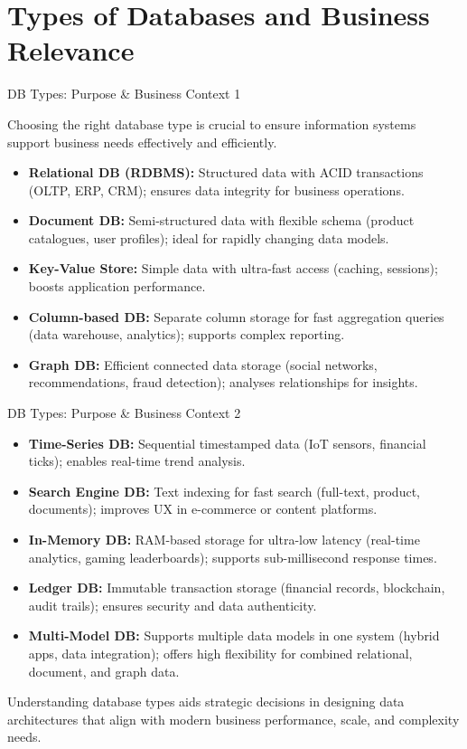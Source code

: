 \documentclass[aspectratio=169, table]{beamer}
\begin{document}
\section{Types of Databases and Business Relevance}

\begin{frame}{DB Types: Purpose \& Business Context 1}
	\vspace{20pt}
	
	Choosing the right database type is crucial to ensure information systems support business needs effectively and efficiently.
		
	\begin{itemize}
		\item \textbf{Relational DB (RDBMS):} Structured data with ACID transactions (OLTP, ERP, CRM); ensures data integrity for business operations.
		\item \textbf{Document DB:} Semi-structured data with flexible schema (product catalogues, user profiles); ideal for rapidly changing data models.
		\item \textbf{Key-Value Store:} Simple data with ultra-fast access (caching, sessions); boosts application performance.
		\item \textbf{Column-based DB:} Separate column storage for fast aggregation queries (data warehouse, analytics); supports complex reporting.
		\item \textbf{Graph DB:} Efficient connected data storage (social networks, recommendations, fraud detection); analyses relationships for insights.
	\end{itemize}
	
\end{frame}

\begin{frame}{DB Types: Purpose \& Business Context 2}
	\vspace{15pt}
	
	\begin{itemize}
		\item \textbf{Time-Series DB:} Sequential timestamped data (IoT sensors, financial ticks); enables real-time trend analysis.
		\item \textbf{Search Engine DB:} Text indexing for fast search (full-text, product, documents); improves UX in e-commerce or content platforms.
		\item \textbf{In-Memory DB:} RAM-based storage for ultra-low latency (real-time analytics, gaming leaderboards); supports sub-millisecond response times.
		\item \textbf{Ledger DB:} Immutable transaction storage (financial records, blockchain, audit trails); ensures security and data authenticity.
		\item \textbf{Multi-Model DB:} Supports multiple data models in one system (hybrid apps, data integration); offers high flexibility for combined relational, document, and graph data.
	\end{itemize}
	
	Understanding database types aids strategic decisions in designing data architectures that align with modern business performance, scale, and complexity needs.
	
\end{frame}
\end{document}
